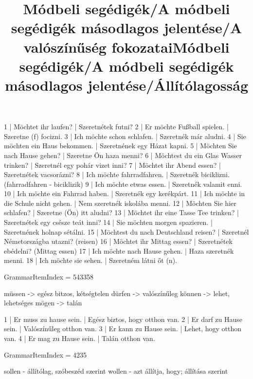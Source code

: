 \begin{exmp}
1 | Möchtet ihr laufen? | Szeretnétek futni?
2 | Er möchte Fußball spielen. | Szeretne (f) focizni.
3 | Ich möchte schon schlafen. | Szeretnék már aludni.
4 | Sie möchten ein Haus bekommen. | Szeretnének egy Házat kapni.
5 | Möchten Sie nach Hause gehen? | Szeretne Ön haza menni?
6 | Möchtest du ein Glas Wasser trinken? | Szeretnél egy pohár vizet inni?
7 | Möchtet ihr Abend essen? | Szeretnétek vacsorázni?
8 | Ich möchte fahrradfahren. | Szeretnék biciklizni. (fahrradfahren - biciklizik)
9 | Ich möchte etwas essen. | Szeretnék valamit enni.
10 | Ich möchte ein Fahrrad haben. | Szeretnék egy kerékpárt.
11 | Ich möchte in die Schule nicht gehen. | Nem szeretnék iskolába menni.
12 | Möchten Sie hier schlafen? | Szeretne (Ön) itt aludni?
13 | Möchtet ihr eine Tasse Tee trinken? | Szeretnétek egy csésze teát inni?
14 | Sie möchten morgen spazieren. | Szeretnének holnap sétálni.
15 | Möchtest du nach Deutschland reisen? | Szeretnél Németországba utazni? (reisen)
16 | Möchtet ihr Mittag essen? | Szeretnétek ebédelni? (Mittag essen)
17 | Ich möchte nach Hause gehen. | Haza szeretnék menni.
18 | Ich möchte sie sehen. | Szeretném látni őt (n).
\end{exmp}

\title{Módbeli segédigék/A módbeli segédigék másodlagos jelentése/A valószínűség fokozatai}

GrammarItemIndex = 543358

\begin{desc}
müssen -> egész bitzos, kétségtelen
dürfen -> valószínűleg
können -> lehet, lehetséges
mögen -> talán
\end{desc}

\begin{exmp}
1 | Er muss zu hause sein. | Egész biztos, hogy otthon van.
2 | Er darf zu Hause sein. | Valószínűleg otthon van.
3 | Er kann zu Hause sein. | Lehet, hogy otthon van.
4 | Er mag zu Hause sein. | Talán otthon van.
\end{exmp}

\title{Módbeli segédigék/A módbeli segédigék másodlagos jelentése/Állítólagosság}

GrammarItemIndex = 4235

\begin{desc}

sollen - állítólag, szóbeszéd szerint
wollen - azt állítja, hogy; állítása szerint

\end{desc}

